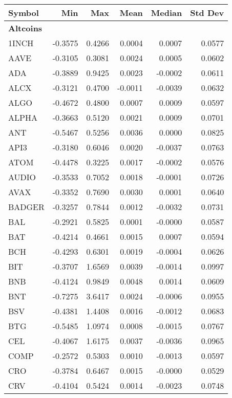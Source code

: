 \begin{table}[ht]
\centering
\scriptsize
\setlength{\tabcolsep}{4pt}
\begin{tabular}{lrrrrr}
\toprule
Symbol & Min & Max & Mean & Median & Std Dev \\
\midrule
\multicolumn{6}{l}{\textbf{Altcoins}} \\
1INCH & -0.3575 & 0.4266 & 0.0004 & 0.0007 & 0.0577 \\
AAVE & -0.3105 & 0.3081 & 0.0024 & 0.0005 & 0.0602 \\
ADA & -0.3889 & 0.9425 & 0.0023 & -0.0002 & 0.0611 \\
ALCX & -0.3121 & 0.4700 & -0.0011 & -0.0039 & 0.0632 \\
ALGO & -0.4672 & 0.4800 & 0.0007 & 0.0009 & 0.0597 \\
ALPHA & -0.3663 & 0.5120 & 0.0021 & 0.0009 & 0.0701 \\
ANT & -0.5467 & 0.5256 & 0.0036 & 0.0000 & 0.0825 \\
API3 & -0.3180 & 0.6046 & 0.0020 & -0.0037 & 0.0763 \\
ATOM & -0.4478 & 0.3225 & 0.0017 & -0.0002 & 0.0576 \\
AUDIO & -0.3533 & 0.7052 & 0.0018 & -0.0001 & 0.0726 \\
AVAX & -0.3352 & 0.7690 & 0.0030 & 0.0001 & 0.0640 \\
BADGER & -0.3257 & 0.7844 & 0.0012 & -0.0032 & 0.0731 \\
BAL & -0.2921 & 0.5825 & 0.0001 & -0.0000 & 0.0587 \\
BAT & -0.4214 & 0.4661 & 0.0015 & 0.0007 & 0.0594 \\
BCH & -0.4293 & 0.6301 & 0.0019 & -0.0004 & 0.0626 \\
BIT & -0.3707 & 1.6569 & 0.0039 & -0.0014 & 0.0997 \\
BNB & -0.4124 & 0.9849 & 0.0048 & 0.0014 & 0.0609 \\
BNT & -0.7275 & 3.6417 & 0.0024 & -0.0006 & 0.0955 \\
BSV & -0.4381 & 1.4408 & 0.0016 & -0.0012 & 0.0683 \\
BTG & -0.5485 & 1.0974 & 0.0008 & -0.0015 & 0.0767 \\
CEL & -0.4067 & 1.6175 & 0.0037 & -0.0036 & 0.0965 \\
COMP & -0.2572 & 0.5303 & 0.0010 & -0.0013 & 0.0597 \\
CRO & -0.3784 & 0.6467 & 0.0015 & -0.0000 & 0.0529 \\
CRV & -0.4104 & 0.5424 & 0.0014 & -0.0023 & 0.0748 \\

\end{tabular}
\end{table}

